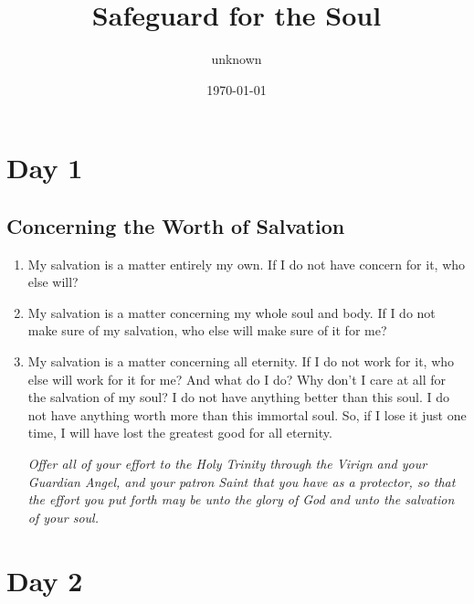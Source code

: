 \documentclass[11pt]{article}
\author{unknown}
\date{\today}
\title{Safeguard for the Soul}
\begin{document}
\maketitle
\newpage

\section*{Day 1}
\label{sec:org5f5e0ed}
\subsection*{Concerning the Worth of Salvation}
\label{sec:org4e3d070}
\begin{enumerate}
\item My salvation is a matter entirely my own. If I do not have concern for it, who else will?
\item My salvation is a matter concerning my whole soul and body. If I do not make sure of my salvation, who else will make sure of it for me?
\item My salvation is a matter concerning all eternity. If I do not work for it, who else will work for it for me?
And what do I do? Why don't I care at all for the salvation of my soul? I do not have anything better than this soul. I do not have anything
worth more than this immortal soul. So, if I lose it just one time, I will have lost the greatest good for all eternity.

\emph{Offer all of your effort to the Holy Trinity through the Virign and your Guardian Angel, and your patron Saint that you have as a protector,
so that the effort you put forth may be unto the glory of God and unto the salvation of your soul.}
\end{enumerate}
\section*{Day 2}
\label{sec:org43a2d4c}
\end{document}
